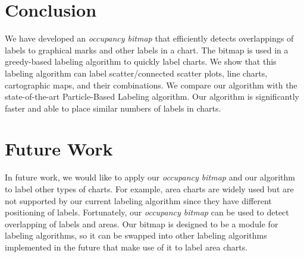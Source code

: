 \section{Conclusion}

We have developed an \emph{occupancy bitmap} that efficiently detects overlappings of labels to graphical marks and other labels in a chart.
The bitmap is used in a greedy-based labeling algorithm to quickly label charts.
We show that this labeling algorithm can label scatter/connected scatter plots, line charts, cartographic maps, and their combinations.
We compare our algorithm with the state-of-the-art Particle-Based Labeling algorithm.
Our algorithm is significantly faster and able to place similar numbers of labels in charts.

\section{Future Work}

In future work, we would like to apply our \emph{occupancy bitmap} and our algorithm to label other types of charts.
For example, area charts are widely used but are not supported by our current labeling algorithm since they have different positioning of labels.
Fortunately, our \emph{occupancy bitmap} can be used to detect overlapping of labels and areas.
Our bitmap is designed to be a module for labeling algorithms, so it can be swapped into other labeling algorithms implemented in the future that make use of it to label area charts.
